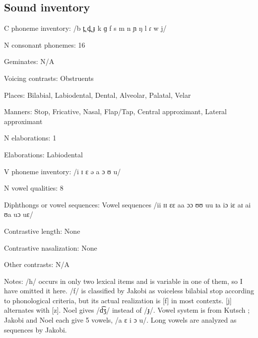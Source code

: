 {\subsection*{Sound inventory}
\begin{appendixdesc}

\item[C phoneme inventory:] /b t̪ d̪ ɟ k ɡ f s m n ɲ ŋ l ɾ w j/

\item[N consonant phonemes:] 16

\item[Geminates:] N/A

\item[Voicing contrasts:] Obstruents

\item[Places:] Bilabial, Labiodental, Dental, Alveolar, Palatal, Velar

\item[Manners:] Stop, Fricative, Nasal, Flap/Tap, Central approximant, Lateral approximant

\item[N elaborations:] 1

\item[Elaborations:] Labiodental

\item[V phoneme inventory:] /i ɪ ɛ ə a ɔ ʊ u/

\item[N vowel qualities:] 8

\item[Diphthongs or vowel sequences:] Vowel sequences /ii ɪɪ ɛɛ aa ɔɔ ʊʊ uu ɪa iɔ iɛ aɪ ai ʊa uɔ uɛ/

\item[Contrastive length:] None

\item[Contrastive nasalization:] None

\item[Other contrasts:] N/A

\item[Notes:] /h/ occurs in only two lexical items and is variable in one of them, so I have omitted it here. /f/ is classified by Jakobi as voiceless bilabial stop according to phonological criteria, but its actual realization is [f] in most contexts. [j] alternates with [z]. Noel gives /d͡ʒ/ instead of /ɟ/. Vowel system is from Kutsch \citet{LojengaWaag2004}; Jakobi and Noel each give 5 vowels, /a ɛ i ɔ u/. Long vowels are analyzed as sequences by Jakobi.
\end{appendixdesc}
}
